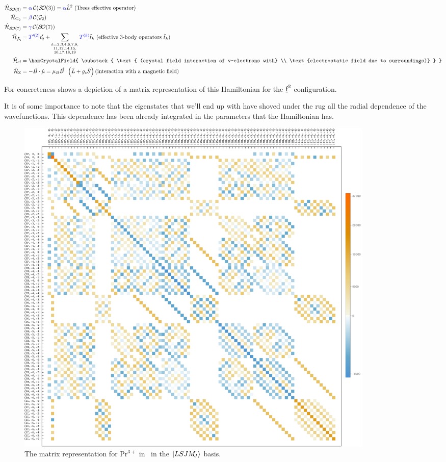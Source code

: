 \documentclass{article}
\begin{document}
\begin{mdframed}
\begin{align}
	\hamTreesSymbol &= \casimirAlpha\casimir{\SO{3}} = \casimirAlpha \op{L}^2 \text{ (Trees effective operator)} \\
	\hamGTwoSymbol      &= \casimirBeta\casimir{\Gtwo} \\
	\hamSOSevenSymbol   &= \casimirGamma\casimir{\SO{7}} \\
	\ham_{\trispoke} &= {\opcolor{T'^{(2)}}}t'_2 + \hamEffectiveThreeBody \text{ (effective 3-body operators $\op{t}_k$)} \\
	\hamCrystalFieldSymbol &= \hamCrystalField {   
		\substack{
			\text{ (crystal field interaction of v-electrons with} \\
			\text{electrostatic field due to surroundings)}
			} 
			}\\
    \hamZeemanSymbol &= -\vec{B} \cdot \op{\mu} = \hamZeeman \text{(interaction with a magnetic field)}
\label{The very effective Hamiltonian}
\end{align}  
\end{mdframed}

For concreteness  shows a depiction of a matrix representation of this Hamiltonian for the $\underbar{$\text{f}$}^2$ configuration.

It is of some importance to note that the eigenstates that we'll end up with have shoved under the rug all the radial dependence of the wavefunctions. This dependence has been already integrated in the parameters that the Hamiltonian has. 

\begin{figure}[h!]
	\begin{center}
		\includegraphics[width=0.85\textwidth]{Prplot.pdf}
	\end{center}
	\caption{The matrix representation for $\text{Pr}^{3+}$ in \LaFthree \, in the $|LSJM_{\!{J}}\rangle$ basis.}
	\label{fig:Pr_in_LaF3} 
\end{figure}
\end{document}
